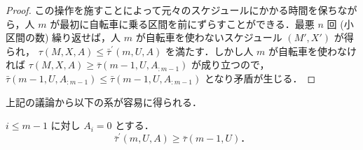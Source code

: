 \begin{proof}
この操作を施すことによって元々のスケジュールにかかる時間を保ちながら，人 $m$ が最初に自転車に乗る区間を前にずらすことができる．最悪 $n$ 回 (小区間の数) 繰り返せば，人 $m$ が自転車を使わないスケジュール $(M\prime, X\prime)$ が得られ， $\tau(M, X, A) \leq \bar\tau^{\prime}(m, U, A)$ を満たす．しかし人 $m$ が自転車を使わなければ $\tau(M, X, A) \geq \bar\tau(m - 1, U, A_{:m-1})$ が成り立つので， $\bar\tau(m - 1, U, A_{:m-1}) \leq \bar\tau(m - 1, U,A_{:m-1})$ となり矛盾が生じる．
\end{proof}
上記の議論から以下の系が容易に得られる．
\begin{corollary}
  $i \leq m - 1$ に対し $A_i = 0$ とする．
  \begin{equation}
    \bar\tau^{\prime}(m, U, A) \geq \bar\tau(m - 1, U)．
  \end{equation}
\end{corollary}
